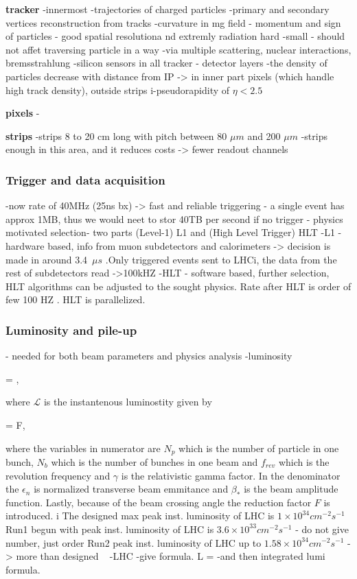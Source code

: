 \textbf{tracker}
-innermost
-trajectories of charged particles
-primary and secondary vertices reconstruction from tracks
-curvature in mg field - momentum and sign of particles
- good spatial resolutiona nd extremly radiation hard
-small
- should not affet traversing particle in a way -via multiple scattering, nuclear interactions, bremsstrahlung
-silicon sensors in all tracker
- detector layers
-the density of particles decrease with distance from IP -> in  inner part pixels (which handle high track density), outside strips
i-pseudorapidity of $\eta < 2.5$

\textbf{pixels}
-


\textbf{strips}
-strips 8 to 20 cm long with pitch between 80 $\mu m$ and 200 $\mu m$
-strips enough in this area, and it reduces costs -> fewer readout channels

\subsubsection{Trigger and data acquisition}

-now rate of 40MHz (25ns bx) -> fast and reliable triggering
- a single event has approx 1MB, thus we would neet to stor 40TB per second if no trigger
- physics motivated selection- two parts (Level-1) L1 and (High Level Trigger) HLT
-L1 - hardware based, info from muon subdetectors and  calorimeters -> decision is made in around 3.4~$\mu s$ .Only triggered events sent to LHCi, the data from the rest of subdetectors read ->100kHZ
-HLT - software based, further selection, HLT algorithms can be adjusted to the sought physics. Rate after HLT is order of few 100 HZ . HLT is parallelized.
 

\subsubsection{Luminosity and pile-up}

- needed for both beam parameters and physics analysis
-luminosity

{
  = \sigma \times {},
}

where $\mathcal{L}$ is the instantenous luminostity given by

{
  = F,
}

where the variables in numerator are $N_{p}$ which is the number of particle in one bunch, $N_{b}$ which is the number of bunches in one beam and $f_{rev}$ which is the revolution frequency and $\gamma$ is the relativistic gamma factor. In the denominator the $\epsilon_{n}$ is normalized transverse beam emmitance and $\beta_{*}$ is the beam amplitude function. Lastly, because of the beam crossing angle the reduction factor $F$ is introduced.
i
The designed max peak inst. luminosity of LHC is $1 \times 10^{34} cm^{-2}s^{-1}$
Run1 begun with peak inst. luminosity of LHC is $3.6 \times 10^{33} cm^{-2}s^{-1}$ - do not give number, just order
Run2  peak inst. luminosity of LHC up to $1.58 \times 10^{34} cm^{-2}s^{-1}$ -> more than designed ~\cite{Pralavorio:2272474} -LHC
-give formula.
{
 L = 
}
-and then integrated lumi formula.

